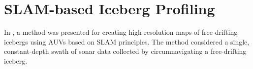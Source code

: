 %
%
%
%
%

\section{SLAM-based Iceberg Profiling}

In \cite{Kimball}, a method was presented for creating high-resolution maps of free-drifting icebergs using AUVs based on SLAM principles. The method considered a single, constant-depth swath of sonar data collected by circumnavigating a free-drifting iceberg. 

